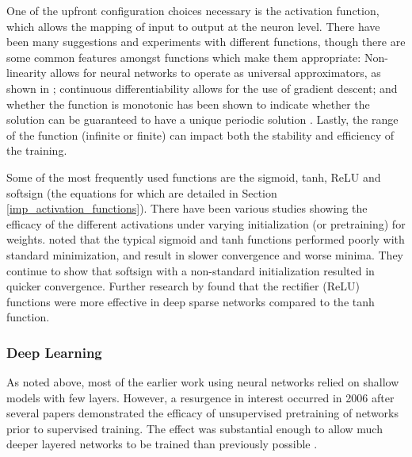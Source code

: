 \documentclass[a4paper,11pt,oneside]{article}
\theoremstyle{plain}
\theoremstyle{definition}
\begin{document}
	One of the upfront configuration choices necessary is the activation function, which allows the mapping of input 
	to output at the neuron level. There have been many suggestions and experiments with different functions, though 
	there are some common features amongst functions which make them appropriate: Non-linearity allows for 
	neural networks to operate as universal approximators, as shown in \citep{Hornik}; continuous differentiability allows for the 
	use of gradient descent; and whether the function is monotonic has been shown to indicate whether the solution 
	can be guaranteed to have a unique periodic solution \citep{Wu}. Lastly, the range of the function (infinite or finite) can impact both the 
	stability and efficiency of the training.
	\hfill \break 
	
	Some of the most frequently used functions are the sigmoid, tanh, ReLU and softsign (the equations for which are detailed in Section \ref{imp_activation_functions}). There have 
	been various studies showing the efficacy of the different activations under varying initialization (or pretraining) 
	for weights. \citet{Glorot} noted that the typical sigmoid and tanh functions performed poorly with standard 
	minimization, and result in slower convergence and worse minima. They continue to show that softsign with a non-standard 
	initialization resulted in quicker convergence. Further research by \citet{Glorot2} found that the 
	rectifier (ReLU) functions were more effective in deep sparse networks compared to the tanh function.
	
	\subsubsection{Deep Learning}
	
	As noted above, most of the earlier work using neural networks relied on shallow models with few layers. 
	However, a resurgence in interest occurred in 2006 after several papers demonstrated the efficacy of 
	unsupervised pretraining of networks prior to supervised training. The effect was substantial enough to allow 
	much deeper layered networks to be trained than previously possible \citep{Bengio1, Hinton1}.
	\hfill \break 
	
\end{document}
